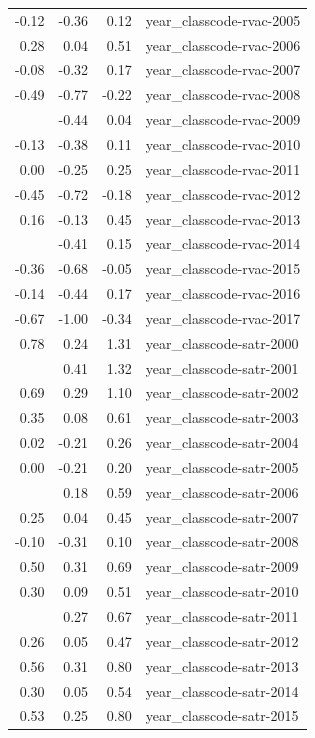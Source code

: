 \documentclass[]{article}
\begin{document}
\begin{longtable}[t]{rrrl}
-0.12 & -0.36 & 0.12 & year\_classcode-rvac-2005\\
0.28 & 0.04 & 0.51 & year\_classcode-rvac-2006\\
-0.08 & -0.32 & 0.17 & year\_classcode-rvac-2007\\
-0.49 & -0.77 & -0.22 & year\_classcode-rvac-2008\\
\addlinespace
-0.20 & -0.44 & 0.04 & year\_classcode-rvac-2009\\
-0.13 & -0.38 & 0.11 & year\_classcode-rvac-2010\\
0.00 & -0.25 & 0.25 & year\_classcode-rvac-2011\\
-0.45 & -0.72 & -0.18 & year\_classcode-rvac-2012\\
0.16 & -0.13 & 0.45 & year\_classcode-rvac-2013\\
\addlinespace
-0.13 & -0.41 & 0.15 & year\_classcode-rvac-2014\\
-0.36 & -0.68 & -0.05 & year\_classcode-rvac-2015\\
-0.14 & -0.44 & 0.17 & year\_classcode-rvac-2016\\
-0.67 & -1.00 & -0.34 & year\_classcode-rvac-2017\\
0.78 & 0.24 & 1.31 & year\_classcode-satr-2000\\
\addlinespace
0.87 & 0.41 & 1.32 & year\_classcode-satr-2001\\
0.69 & 0.29 & 1.10 & year\_classcode-satr-2002\\
0.35 & 0.08 & 0.61 & year\_classcode-satr-2003\\
0.02 & -0.21 & 0.26 & year\_classcode-satr-2004\\
0.00 & -0.21 & 0.20 & year\_classcode-satr-2005\\
\addlinespace
0.39 & 0.18 & 0.59 & year\_classcode-satr-2006\\
0.25 & 0.04 & 0.45 & year\_classcode-satr-2007\\
-0.10 & -0.31 & 0.10 & year\_classcode-satr-2008\\
0.50 & 0.31 & 0.69 & year\_classcode-satr-2009\\
0.30 & 0.09 & 0.51 & year\_classcode-satr-2010\\
\addlinespace
0.47 & 0.27 & 0.67 & year\_classcode-satr-2011\\
0.26 & 0.05 & 0.47 & year\_classcode-satr-2012\\
0.56 & 0.31 & 0.80 & year\_classcode-satr-2013\\
0.30 & 0.05 & 0.54 & year\_classcode-satr-2014\\
0.53 & 0.25 & 0.80 & year\_classcode-satr-2015\\

\end{longtable}
\end{document}
